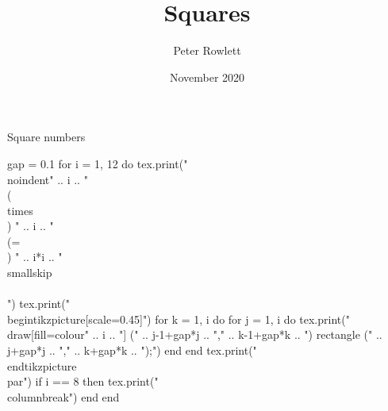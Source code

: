 \documentclass{article}
\title{Squares}
\author{Peter Rowlett}
\date{November 2020}
\begin{document}
\begin{center}{\Huge Square numbers}\end{center}
\Large

\begin{multicols}{2}
\begin{center}
\begin{luacode*}
gap = 0.1
for i = 1, 12 do
    tex.print("\\noindent" .. i .. " \\(\\times\\) " .. i .. " \\(=\\) " .. i*i .. "\\smallskip\\\\")
    tex.print("\\begin{tikzpicture}[scale=0.45]")
    for k = 1, i do
        for j = 1, i do
            tex.print("\\draw[fill=colour" .. i .. "] (" .. j-1+gap*j .. "," .. k-1+gap*k .. ") rectangle (" .. j+gap*j .. "," .. k+gap*k .. ");")
        end
    end
    tex.print("\\end{tikzpicture}\\par")
    if i == 8 then
    tex.print("\\columnbreak")
    end
end
\end{luacode*}
\end{center}
\end{multicols}
\end{document}

